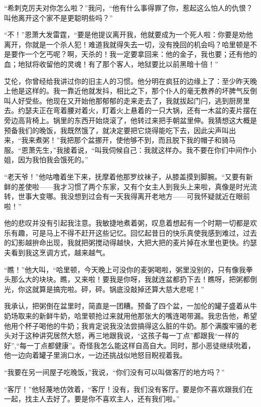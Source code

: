 {    \par “希刺克厉夫对你怎么啦？”我问，“他有什么事得罪了你，惹起这么怕人的仇恨？叫他离开这个家不是更聪明些吗？”
    \par “不！”恩萧大发雷霆，“要是他提议离开我，他就要成为一个死人啦：你要是劝他离开，你就是一个杀人犯！难道我就得失去一切，没有挽回的机会吗？哈里顿是不是要作一个乞丐呢？啊，天杀的！我一定要拿回来：他的金子，我也要；还有他的血；地狱将收留他的灵魂！有了那个客人，地狱要比以前黑暗十倍！”
    \par 艾伦，你曾经给我讲过你的旧主人的习惯。他分明在疯狂的边缘上了：至少昨天晚上他是这样的。我一靠近他就发抖，相比之下，那个仆人的毫无教养的坏脾气反倒叫人好受些。他现在又开始他那郁郁的走来走去了，我就拔起门闩，逃到厨房里去。约瑟夫正在弯着腰对着火，盯着火上悬着的一只大锅，还有一木盆的麦片摆在旁边高背椅上。锅里的东西开始烧滚了，他转过来把手朝盆里伸。我猜想这大概是预备我们的晚饭，我既然饿了，就决定要把它烧得能吃下去，因此尖声叫出来，“我来煮粥！”我把那个盆挪开，使他够不到，而且脱下我的帽子和骑马服。“恩萧先生，”我接着说，“叫我伺候自己：我就这样办。我不要在你们中间作小姐，因为我怕我会饿死的。”
    \par “老天爷！”他咕噜着坐下来，抚摩着他那罗纹袜子，从膝盖摸到脚腕。“又要有新鲜的差使啦——我才习惯了两个东家，又有个女主人到我头上来啦，真像是时光流转，世事大变哪。我没想到过会有一天我得离开老地方——可我怀疑就近在眼前啦！”
    \par 他的悲叹并没有引起我注意。我敏捷地煮着粥，叹息着想起有一个时期一切都是欢乐有趣，可是马上不得不赶开这些记忆。回忆起昔日的快乐真使我感到难过，过去的幻影越拚命出现，我就把粥搅动得越快，大把大把的麦片掉在水里也更快。约瑟夫看到我这烹调方式，越来越气。
    \par “瞧！”他大叫，“哈里顿，今天晚上可没你的麦粥喝啦，粥里没别的，只有像我拳头那么大的块块。瞧，又来啦！要我是你呀，我就连盆都扔下去！瞧呀，把粥都倒光，你这就算是搞完啦。砰，砰。锅底没敲掉还算大慈大悲呢！”
    \par 我承认，把粥倒在盆里时，简直是一团糟。预备了四个盆，一加伦的罐子盛着从牛奶场取来的新鲜牛奶，哈里顿抢过来就用他那张大的嘴连喝带漏。我忠告他，希望他用个杯子喝他的牛奶；我肯定说我没法尝搞得这么脏的牛奶。那个满腹牢骚的老头对于这种讲究居然大怒，再三地跟我说，“这孩子每一丁点”都跟我“一样的好”,“每一丁点都健康”。奇怪我怎么能这样自高自大。同时，那小恶徒继续吮着，他一边向着罐子里淌口水，一边还挑战似地怒目睨视着我。
    \par “我要在另一间屋子吃晚饭，”我说，“你们没有可以叫做客厅的地方吗？”
    \par “客厅！”他轻蔑地仿效着，“客厅！没有，我们没有客厅。要是你不喜欢跟我们在一起，找主人去好了。要是你不喜欢主人，还有我们啦。”
}
